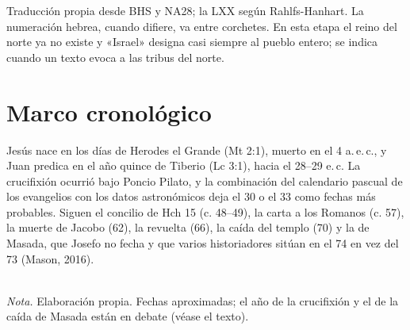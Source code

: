 \documentclass[11pt,letterpaper]{article}
\begin{document}
\begin{nota}
Traducción propia desde BHS y NA28; la LXX según Rahlfs-Hanhart. La numeración hebrea, cuando difiere, va entre corchetes. En esta etapa el reino del norte ya no existe y «Israel» designa casi siempre al pueblo entero; se indica cuando un texto evoca a las tribus del norte.
\end{nota}

\section{Marco cronológico}

Jesús nace en los días de Herodes el Grande (Mt 2:1), muerto en el 4 a.\,e.\,c., y Juan predica en el año quince de Tiberio (Lc 3:1), hacia el 28--29 e.\,c. La crucifixión ocurrió bajo Poncio Pilato, y la combinación del calendario pascual de los evangelios con los datos astronómicos deja el 30 o el 33 como fechas más probables. Siguen el concilio de Hch 15 (c. 48--49), la carta a los Romanos (c. 57), la muerte de Jacobo (62), la revuelta (66), la caída del templo (70) y la de Masada, que Josefo no fecha y que varios historiadores sitúan en el 74 en vez del 73 (Mason, 2016).

\begin{center}
\\[2pt]
{\footnotesize\color{sepia}\textit{Nota.} Elaboración propia. Fechas aproximadas; el año de la crucifixión y el de la caída de Masada están en debate (véase el texto).}
\end{center}
\end{document}
